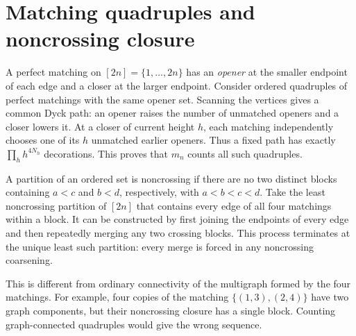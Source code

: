 \documentclass[11pt,letterpaper]{article}
\numberwithin{equation}{section}
\theoremstyle{remark}\newtheorem{remark}[theorem]{Remark}
\begin{document}
\section{Matching quadruples and noncrossing closure}\label{pwd:qt:sec:combinatorics}
A perfect matching on $[2n]=\{1,\ldots,2n\}$ has an \emph{opener} at the smaller endpoint of each edge and a closer at the larger endpoint. Consider ordered quadruples of perfect matchings with the same opener set. Scanning the vertices gives a common Dyck path: an opener raises the number of unmatched openers and a closer lowers it. At a closer of current height $h$, each matching independently chooses one of its $h$ unmatched earlier openers. Thus a fixed path has exactly $\prod_hh^{4N_h}$ decorations. This proves that $m_n$ counts all such quadruples.

A partition of an ordered set is noncrossing if there are no two distinct blocks containing $a<c$ and $b<d$, respectively, with $a<b<c<d$. Take the least noncrossing partition of $[2n]$ that contains every edge of all four matchings within a block. It can be constructed by first joining the endpoints of every edge and then repeatedly merging any two crossing blocks. This process terminates at the unique least such partition: every merge is forced in any noncrossing coarsening.

This is different from ordinary connectivity of the multigraph formed by the four matchings. For example, four copies of the matching $\{(1,3),(2,4)\}$ have two graph components, but their noncrossing closure has a single block. Counting graph-connected quadruples would give the wrong sequence.
\end{document}
